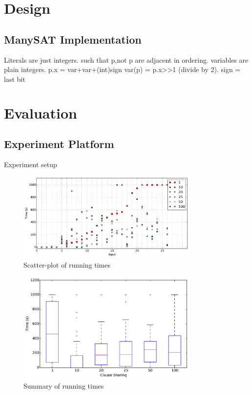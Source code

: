\documentclass{article}
\begin{document}
\section{Design}

\subsection{ManySAT Implementation}

Literals are just integers. such that p,not p are adjacent in ordering. 
variables are plain integers. p.x = var+var+(int)sign
var(p) = p.x>>1 (divide by 2). sign = last bit 


\section{Evaluation}


\subsection{Experiment Platform}
Experiment setup

\begin{figure}[h]
  \centering
  \includegraphics[width=0.8\textwidth]{../figs/scatter_all.pdf}
  \caption{Scatter-plot of running times}
  \label{fig:scatter-1}
\end{figure}

\begin{figure}[h]
  \centering
    \includegraphics[width=0.8\textwidth]{../figs/boxplot_all.pdf}
  \caption{Summary of running times}
  \label{fig:boxplot-1}
\end{figure}








\end{document}
